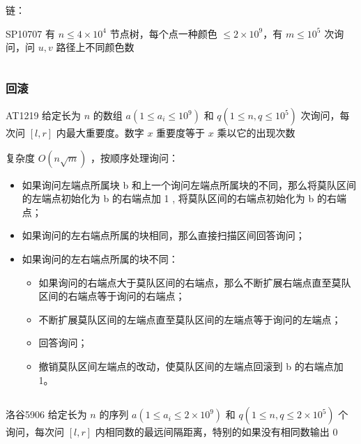 \documentclass[twocolumn,10pt]{ctexart}
\begin{document}
\inputminted{cpp}{code/ext_074.cpp}

链：

\begin{notebox}
SP10707 有 $n\le4\times10^4$ 节点树，每个点一种颜色 $\le2\times10^9$，有 $m\le10^5$ 次询问，问 $u,v$ 路径上不同颜色数
\end{notebox}

\inputminted{cpp}{code/sp10707_mo_algo.cpp}

\subsubsection{回滚}

\begin{notebox}
AT1219 给定长为 $n$ 的数组 $a(1\le a_i\le10^9)$ 和 $q(1\le n,q\le10^5)$ 次询问，每次问 $[l,r]$ 内最大重要度。数字 $x$ 重要度等于 $x$ 乘以它的出现次数
\end{notebox}

复杂度 $O(n\sqrt m)$ ，按顺序处理询问：

\begin{itemize}
\item 如果询问左端点所属块 b 和上一个询问左端点所属块的不同，那么将莫队区间的左端点初始化为 b 的右端点加 1 , 将莫队区间的右端点初始化为 b 的右端点；
\item 如果询问的左右端点所属的块相同，那么直接扫描区间回答询问；
\item 如果询问的左右端点所属的块不同：

\begin{itemize}
\item 如果询问的右端点大于莫队区间的右端点，那么不断扩展右端点直至莫队区间的右端点等于询问的右端点；
\item 不断扩展莫队区间的左端点直至莫队区间的左端点等于询问的左端点；
\item 回答询问；
\item 撤销莫队区间左端点的改动，使莫队区间的左端点回滚到 b 的右端点加 1。
\end{itemize}
\end{itemize}

\inputminted{cpp}{code/at1219_mo_algo.cpp}

\begin{notebox}
洛谷5906 给定长为 $n$ 的序列 $a(1\le a_i\le2\times10^9)$ 和 $q(1\le n,q\le2\times10^5)$ 个询问，每次问 $[l,r]$ 内相同数的最远间隔距离，特别的如果没有相同数输出 $0$
\end{notebox}

\inputminted{cpp}{code/p5906_mo_algo.cpp}
\end{document}
